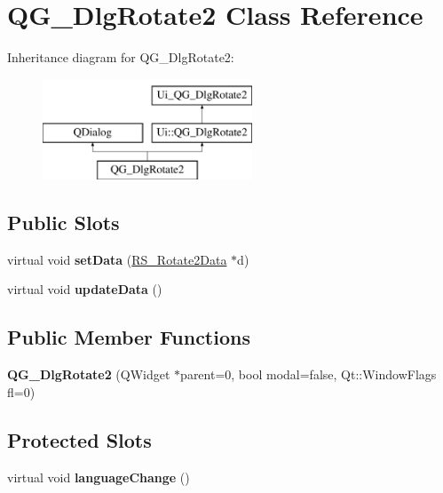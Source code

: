 \hypertarget{classQG__DlgRotate2}{\section{Q\-G\-\_\-\-Dlg\-Rotate2 Class Reference}
\label{classQG__DlgRotate2}
}
Inheritance diagram for Q\-G\-\_\-\-Dlg\-Rotate2\-:\begin{figure}[H]
\begin{center}
\leavevmode
\includegraphics[height=3.000000cm]{classQG__DlgRotate2}
\end{center}
\end{figure}
\subsection*{Public Slots}
\begin{DoxyCompactItemize}
\item 
\hypertarget{classQG__DlgRotate2_aa76718b72194795d349b2efb542b76ca}{virtual void {\bfseries set\-Data} (\hyperlink{classRS__Rotate2Data}{R\-S\-\_\-\-Rotate2\-Data} $\ast$d)}\label{classQG__DlgRotate2_aa76718b72194795d349b2efb542b76ca}

\item 
\hypertarget{classQG__DlgRotate2_aacf0425d1897601ccff23b4bd2fe63af}{virtual void {\bfseries update\-Data} ()}\label{classQG__DlgRotate2_aacf0425d1897601ccff23b4bd2fe63af}

\end{DoxyCompactItemize}
\subsection*{Public Member Functions}
\begin{DoxyCompactItemize}
\item 
\hypertarget{classQG__DlgRotate2_a3b2fbe80caed2ffb0afb04612dda8468}{{\bfseries Q\-G\-\_\-\-Dlg\-Rotate2} (Q\-Widget $\ast$parent=0, bool modal=false, Qt\-::\-Window\-Flags fl=0)}\label{classQG__DlgRotate2_a3b2fbe80caed2ffb0afb04612dda8468}

\end{DoxyCompactItemize}
\subsection*{Protected Slots}
\begin{DoxyCompactItemize}
\item 
\hypertarget{classQG__DlgRotate2_a80e1f419ffcd4461ef094c5dd8a07245}{virtual void {\bfseries language\-Change} ()}\label{classQG__DlgRotate2_a80e1f419ffcd4461ef094c5dd8a07245}

\end{DoxyCompactItemize}
